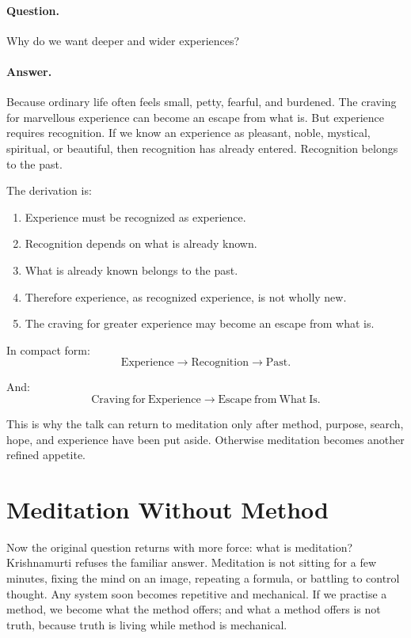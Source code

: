 \paragraph{Question.}
Why do we want deeper and wider experiences?

\paragraph{Answer.}
Because ordinary life often feels small, petty, fearful, and burdened. The craving for marvellous experience can become an escape from what is. But experience requires recognition. If we know an experience as pleasant, noble, mystical, spiritual, or beautiful, then recognition has already entered. Recognition belongs to the past.

The derivation is:
\begin{enumerate}
\item Experience must be recognized as experience.
\item Recognition depends on what is already known.
\item What is already known belongs to the past.
\item Therefore experience, as recognized experience, is not wholly new.
\item The craving for greater experience may become an escape from what is.
\end{enumerate}

In compact form:
\begin{equation}
\mathrm{Experience}
\longrightarrow
\mathrm{Recognition}
\longrightarrow
\mathrm{Past}.
\end{equation}

And:
\begin{equation}
\mathrm{Craving\ for\ Experience}
\longrightarrow
\mathrm{Escape\ from\ What\ Is}.
\end{equation}

This is why the talk can return to meditation only after method, purpose, search, hope, and experience have been put aside. Otherwise meditation becomes another refined appetite.

\section{Meditation Without Method}

Now the original question returns with more force: what is meditation? Krishnamurti refuses the familiar answer. Meditation is not sitting for a few minutes, fixing the mind on an image, repeating a formula, or battling to control thought. Any system soon becomes repetitive and mechanical. If we practise a method, we become what the method offers; and what a method offers is not truth, because truth is living while method is mechanical.

